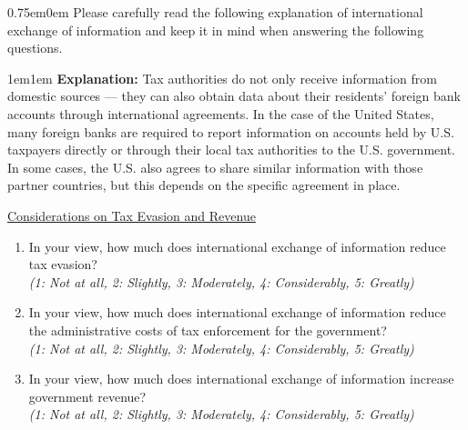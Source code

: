 \documentclass[11pt]{article}
\begin{document}
\begin{adjustwidth}{0.75em}{0em} Please carefully read the following explanation of international exchange of information and keep it in mind when answering the following questions.\end{adjustwidth}
\vspace{0.5em}
\begin{adjustwidth}{1em}{1em} \textbf{Explanation:} Tax authorities do not only receive information from domestic sources — they can also obtain data about their residents’ foreign bank accounts through international agreements. In the case of the United States, many foreign banks are required to report information on accounts held by U.S. taxpayers directly or through their local tax authorities to the U.S. government. In some cases, the U.S. also agrees to share similar information with those partner countries, but this depends on the specific agreement in place. \\
\end{adjustwidth}
\underline{Considerations on Tax Evasion and Revenue}
\begin{enumerate}[resume]
    \item In your view, how much does international exchange of information reduce tax evasion? \\
    \textit{(1: Not at all, 2: Slightly, 3: Moderately, 4: Considerably, 5: Greatly)} 
    \item In your view, how much does international exchange of information reduce the administrative costs of tax enforcement for the government?\\
    \textit{(1: Not at all, 2: Slightly, 3: Moderately, 4: Considerably, 5: Greatly)} 
    \item In your view, how much does international exchange of information increase government revenue?  \\
    \textit{(1: Not at all, 2: Slightly, 3: Moderately, 4: Considerably, 5: Greatly)} 
\end{enumerate}
\end{document}
